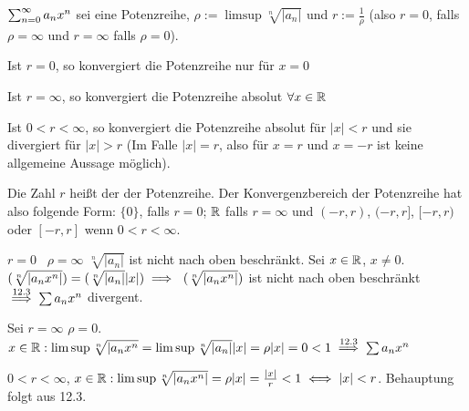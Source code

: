 \documentclass[a4paper,oneside,DIV15,BCOR12mm]{scrbook}
\begin{document}
\begin{satz}
$\sum_{n=0}^{\infty}{a_nx^n}$ sei eine Potenzreihe, $\rho:=\limsup \sqrt[n]{|a_n|}$ und $r:=\frac{1}{\rho}$ (also $r=0$, falls $\rho=\infty$ und $r=\infty$ falls $\rho=0$).
\begin{liste}
\item Ist $r=0$, so konvergiert die Potenzreihe nur für $x=0$
\item Ist $r=\infty$, so konvergiert die Potenzreihe absolut $\forall x\in\mathbb{R}$
\item Ist $0<r<\infty$, so konvergiert die Potenzreihe absolut für $|x|<r$ und sie divergiert für $|x|>r$
(Im Falle $|x|=r$, also für $x=r$ und $x=-r$ ist keine allgemeine Aussage möglich).
\end{liste}
Die Zahl $r$ heißt der  der Potenzreihe. Der Konvergenzbereich der Potenzreihe hat also folgende Form: $\{0\}$, falls $r=0$; $\mathbb{R}$ falls $r=\infty$ und $(-r, r)$, $(-r, r]$, $[-r, r)$ oder $[-r, r]$ wenn $0<r<\infty$.
\end{satz}

\begin{beweise}
\item $r=0$ \folgt\ $\rho=\infty$ \folgt $\sqrt[n]{|a_n|}$ ist nicht nach oben beschränkt. Sei $x\in\mathbb{R}$, $x\ne0$.
$(\sqrt[n]{|a_nx^n|})=(\sqrt[n]{|a_n|}|x|) \implies\ (\sqrt[n]{|a_nx^n|})$ ist nicht nach oben beschränkt $\overset{\text{12.3}}{\implies} \sum{a_nx^n}$ divergent.
\item Sei $r=\infty$ \folgt $\rho=0$. $x\in\mathbb{R} : \limsup \sqrt[n]{|a_nx^n}=\limsup \sqrt[n]{|a_n|}|x|=\rho|x|=0<1 \overset{\text{12.3}}{\implies} \sum{a_nx^n}$
\item $0<r<\infty$, $x\in\mathbb{R}: \limsup \sqrt[n]{|a_nx^n|} = \rho |x| = \frac{|x|}{r}<1 \iff |x| < r$. Behauptung folgt aus 12.3.
\end{beweise}
\end{document}
